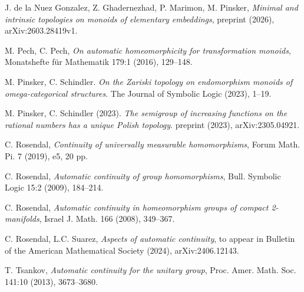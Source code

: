\documentclass[11pt]{amsart}
\theoremstyle{definition}
\begin{document}
\begin{thebibliography}{}
J. de la Nuez Gonzalez, Z. Ghadernezhad, P. Marimon, M. Pinsker, {\em Minimal and intrinsic topologies on monoids of elementary embeddings}, preprint (2026), arXiv:2603.28419v1.

M. Pech, C. Pech, {\em On automatic homeomorphicity for transformation monoids},
Monatshefte f{\"u}r Mathematik 179:1 (2016), 129--148.


 M. Pinsker, C. Schindler. {\em On the Zariski topology on endomorphism
monoids of omega-categorical structures}. The Journal of Symbolic Logic (2023), 
1--19.
   
 M. Pinsker,  C. Schindler (2023). {\em The semigroup of increasing functions on the rational numbers has a unique Polish topology}. preprint (2023), arXiv:2305.04921.


C. Rosendal, {\em Continuity of universally measurable homomorphisms}, Forum Math. Pi. 7 (2019), e5, 20 pp.

C. Rosendal, {\em Automatic continuity of group homomorphisms}, Bull. Symbolic Logic 15:2 (2009), 184--214.

C. Rosendal, {\em Automatic continuity in homeomorphism groups of compact 2-manifolds}, Israel J. Math. 166 (2008), 349--367.


C. Rosendal, L.C. Suarez, {\em Aspects of automatic continuity}, to appear in Bulletin of the American Mathematical Society (2024), arXiv:2406.12143. 

T. Tsankov, {\em Automatic continuity for the unitary group}, Proc. Amer. Math. Soc. 141:10 (2013), 3673--3680.

\end{thebibliography}
\end{document}
